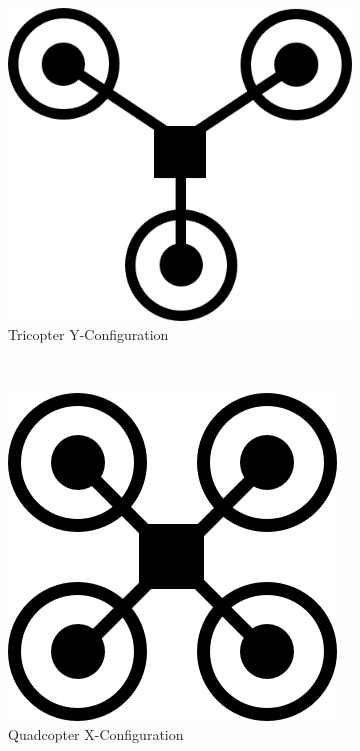 \begin{figure}[b]
	\centering
	\begin{subfigure}[b]{0.3\textwidth}
		\centering
		\includegraphics[scale=0.4]{img/drone_yconfig}
		\caption{Tricopter Y-Configuration}
		\label{fig:tricopter-y}
	\end{subfigure}
	~
	\begin{subfigure}[b]{0.3\textwidth}
		\centering
		\includegraphics[scale=0.4]{img/drone_xconfig}
		\caption{Quadcopter X-Configuration}
		\label{fig:quadcopter-x}
	\end{subfigure}
	~
	\begin{subfigure}[b]{0.3\textwidth}
		\centering

\end{subfigure}
\end{figure}

